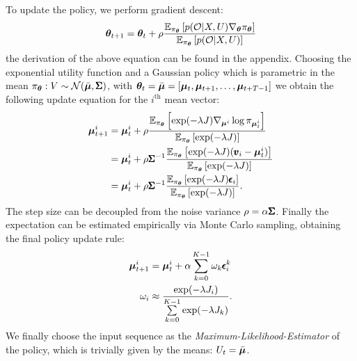 To update the policy, we perform gradient descent:
\begin{equation}
    \boldsymbol{\theta}_{t+1} = \boldsymbol{\theta}_t + \rho \frac{\mathbb{E}_{\pi_{\boldsymbol{\theta}}} \left [p(\mathcal{O} | X, U) \nabla_{\boldsymbol{\theta}}\pi_{\boldsymbol{\theta}}\right]}{\mathbb{E}_{\pi_{\boldsymbol{\theta}}} \left [p(\mathcal{O} | X, U)\right]}
\end{equation}
the derivation of the above equation can be found in the appendix. 
Choosing the exponential utility function and a Gaussian policy which is parametric in the mean $\pi_{\boldsymbol{\theta}}: V \sim \mathcal{N}(\bar{\boldsymbol{\mu}}, \pmb{\Sigma})$, with $\boldsymbol{\theta}_t = \bar{\boldsymbol{\mu}} = [\boldsymbol{\mu}_t, \boldsymbol{\mu}_{t+1}, \dots, \boldsymbol{\mu}_{t+T-1}]$ we obtain the following update equation for the $i^{\text{th}}$ mean vector:
\begin{align}
    \boldsymbol{\mu}^{i}_{t+1} &=  \boldsymbol{\mu}^{i}_{t} + \rho \frac{\mathbb{E}_{\pi_{\boldsymbol{\theta}}} \left [ \exp( -\lambda J) \nabla_{\boldsymbol{\mu}^{i}} \log \pi_{\boldsymbol{\mu}^{i}_{t}}\right]}{\mathbb{E}_{\pi_{\boldsymbol{\theta}}} \left [\exp( -\lambda J)\right]} \\
    &= \boldsymbol{\mu}^{i}_{t} +  \rho \pmb{\Sigma}^{-1}\frac{\mathbb{E}_{\pi_{\boldsymbol{\theta}}} \left [\exp( -\lambda J) (\pmb{v}_i - \boldsymbol{\mu}^{i}_{t} )\right]}{\mathbb{E}_{\pi_{\boldsymbol{\theta}}} \left [\exp( -\lambda J)\right]}  \label{eq:bayes_to_mppi} \\
    &= \boldsymbol{\mu}^{i}_{t} +  \rho \pmb{\Sigma}^{-1} \frac{\mathbb{E}_{\pi_{\boldsymbol{\theta}}} \left [\exp( -\lambda J) \pmb{\epsilon}_i \right]}{\mathbb{E}_{\pi_{\boldsymbol{\theta}}} \left [\exp( -\lambda J)\right]}  \label{eq:alpha_assumption}.
\end{align}
The step size can be decoupled from the noise variance $\rho = \alpha \pmb{\Sigma} $. Finally the expectation can be estimated empirically via Monte Carlo sampling, obtaining the final policy update rule:
\begin{align} \label{eq:update_rule}
  \boldsymbol{\mu}^{i}_{t+1} &= \boldsymbol{\mu}^{i}_{t} + \alpha  \sum \limits_{k=0}^{K-1}  \omega_k \pmb{\epsilon}_{i}^{k} \\
  \omega_i  &\approx \frac{\exp ( -\lambda J_i )}{\sum \limits_{k=0}^{K-1} \exp ( -\lambda J_k)}.
\end{align}
We finally choose the input sequence as the \emph{Maximum-Likelihood-Estimator} of the policy, which is trivially given by the means: $U_t = \bar{\boldsymbol{\mu}}$.

